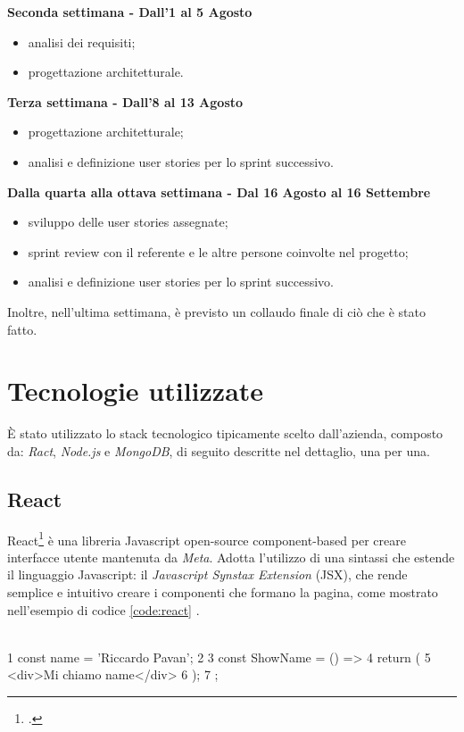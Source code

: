 \noindent\textbf{Seconda settimana - Dall'1 al 5 Agosto}

\begin{itemize}
  \item analisi dei requisiti;
  \item progettazione architetturale.
\end{itemize}

\noindent\textbf{Terza settimana - Dall'8 al 13 Agosto}

\begin{itemize}
  \item progettazione architetturale;
  \item analisi e definizione user stories per lo sprint successivo.
\end{itemize}

\noindent\textbf{Dalla quarta alla ottava settimana - Dal 16 Agosto al 16 Settembre}

\begin{itemize}
  \item sviluppo delle user stories assegnate;
  \item sprint review con il referente e le altre persone coinvolte nel progetto;
  \item analisi e definizione user stories per lo sprint successivo.
\end{itemize}

\noindent Inoltre, nell'ultima settimana, è previsto un collaudo finale di ciò che è stato fatto.

\section{Tecnologie utilizzate}

È stato utilizzato lo stack tecnologico tipicamente scelto dall'azienda, composto da: \emph{Ract}, \emph{Node.js} e \emph{MongoDB}, di seguito descritte nel dettaglio, una per una.

\subsection{React}

React\footcite{site:react} è una libreria Javascript open-source component-based per creare interfacce utente mantenuta da \emph{Meta}. Adotta l'utilizzo di una sintassi che estende il linguaggio Javascript: il \emph{Javascript Synstax Extension} (JSX), che rende semplice e intuitivo creare i componenti che formano la pagina, come mostrato nell'esempio di codice \ref{code:react} .\\
\begin{code}[frame=tb, label={code:react}, caption={Esempio di utlizzo di codice JSX}]\\  
1  const name = 'Riccardo Pavan';
2
3  const ShowName = () => {
4    return (
5      <div>Mi chiamo {name}</div>
6    );
7  };

\end{code}

